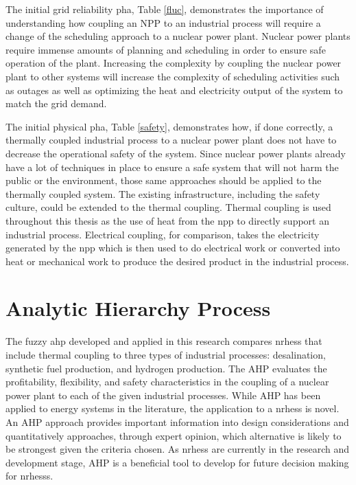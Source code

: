 The initial grid reliability \ac{pha}, Table \ref{fluc}, demonstrates the importance of understanding how coupling an NPP to an industrial process will require a change of the scheduling approach to a nuclear power plant. Nuclear power plants require immense amounts of planning and scheduling in order to ensure safe operation of the plant.  Increasing the complexity by coupling the nuclear power plant to other systems will increase the complexity of scheduling activities such as outages as well as optimizing the heat and electricity output of the system to match the grid demand.

The initial physical \ac{pha}, Table \ref{safety},  demonstrates how, if done correctly, a thermally coupled industrial process to a nuclear power plant does not have to decrease the operational safety of the system.  Since nuclear power plants already have a lot of techniques in place to ensure a safe system that will not harm the public or the environment, those same approaches should be applied to the thermally coupled system. The existing infrastructure, including the safety culture, could be extended to the thermal coupling. Thermal coupling is used throughout this thesis as the use of heat from the \ac{npp} to directly support an industrial process.  Electrical coupling, for comparison, takes the electricity generated by the \ac{npp} which is then used to do electrical work or converted into heat or mechanical work to produce the desired product in the industrial process.


\section{Analytic Hierarchy Process}
The fuzzy \ac{ahp} developed and applied in this research compares \ac{nrhess} that include thermal coupling to three types of industrial processes: desalination, synthetic fuel production, and hydrogen production.  The AHP evaluates the profitability, flexibility, and safety characteristics in the coupling of a nuclear power plant to each of the given industrial processes. While AHP has been applied to energy systems in the literature, the application to a \ac{nrhess} is novel. An AHP approach provides important information into design considerations and quantitatively approaches, through expert opinion, which alternative is likely to be strongest given the criteria chosen. As \ac{nrhess} are currently in the research and development stage, AHP is a beneficial tool to develop for future decision making for \ac{nrhess}s.

